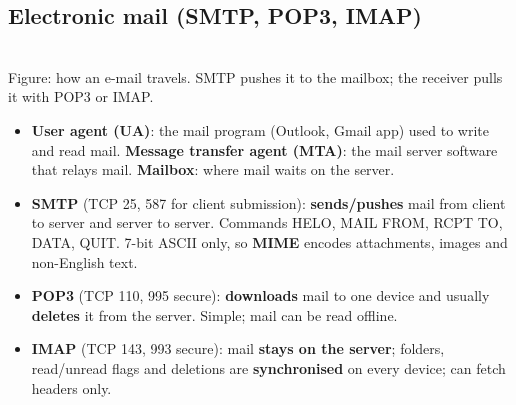\documentclass[10pt]{article}
\begin{document}
\subsection{Electronic mail (SMTP, POP3, IMAP)}
\begin{center}
\\
{\scriptsize\color{midgrey}Figure: how an e-mail travels. SMTP pushes it to the mailbox; the receiver pulls it with POP3 or IMAP.}
\end{center}
\begin{itemize}
\item \textbf{User agent (UA)}: the mail program (Outlook, Gmail app) used to write and read mail. \textbf{Message transfer agent (MTA)}: the mail server software that relays mail. \textbf{Mailbox}: where mail waits on the server.
\item \textbf{SMTP} (TCP 25, 587 for client submission): \textbf{sends/pushes} mail from client to server and server to server. Commands HELO, MAIL FROM, RCPT TO, DATA, QUIT. 7-bit ASCII only, so \textbf{MIME} encodes attachments, images and non-English text.
\item \textbf{POP3} (TCP 110, 995 secure): \textbf{downloads} mail to one device and usually \textbf{deletes} it from the server. Simple; mail can be read offline.
\item \textbf{IMAP} (TCP 143, 993 secure): mail \textbf{stays on the server}; folders, read/unread flags and deletions are \textbf{synchronised} on every device; can fetch headers only.
\end{itemize}
\end{document}
